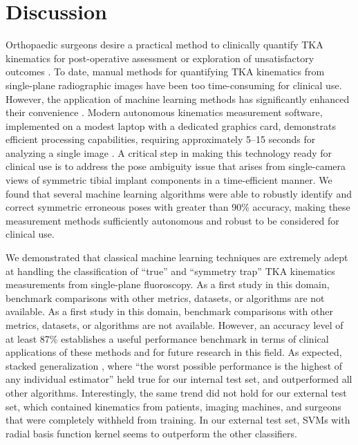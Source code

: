 {\section{Discussion}
Orthopaedic surgeons desire a practical method to clinically quantify TKA kinematics for post-operative assessment or exploration of unsatisfactory outcomes \cite{banksWhatPostoperativeOutcome2017}.
To date, manual methods for quantifying TKA kinematics from single-plane radiographic images have been too time-consuming for clinical use. However, the application of machine learning methods has significantly enhanced their convenience \cite{jensenJointTrackMachine2023}.
Modern autonomous kinematics measurement software, implemented on a modest laptop with a dedicated graphics card, demonstrats efficient processing capabilities, requiring approximately 5–15 seconds for analyzing a single image \cite{jensenJointTrackMachine2023}.
A critical step in making this technology ready for clinical use is to address the pose ambiguity issue that arises from single-camera views of symmetric tibial implant components in a time-efficient manner.
We found that several machine learning algorithms were able to robustly identify and correct symmetric erroneous poses with greater than 90\% accuracy, making these measurement methods sufficiently autonomous and robust to be considered for clinical use.

We demonstrated that classical machine learning techniques are extremely adept at handling the classification of “true” and “symmetry trap” TKA kinematics measurements from single-plane fluoroscopy.
As a first study in this domain, benchmark comparisons with other metrics, datasets, or algorithms are not available.
As a first study in this domain, benchmark comparisons with other metrics, datasets, or algorithms are not available.
However, an accuracy level of at least 87\% establishes a useful performance benchmark in terms of clinical applications of these methods and for future research in this field.
As expected, stacked generalization \cite{wolpertStackedGeneralization1992,smythLinearlyCombiningDensity1999}, where “the worst possible performance is the highest of any individual estimator” held true for our internal test set, and outperformed all other algorithms.
Interestingly, the same trend did not hold for our external test set, which contained kinematics from patients, imaging machines, and surgeons that were completely withheld from training. In our external test set, SVMs with radial basis function kernel seems to outperform the other classifiers.


}
